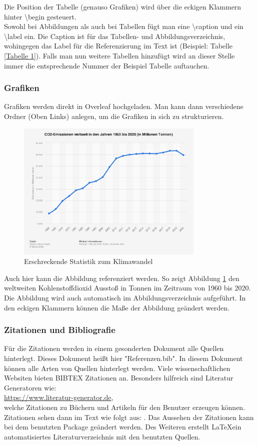 Die Position der Tabelle (genauso Grafiken) wird über die eckigen Klammern hinter \textbackslash begin gesteuert.\\ Sowohl bei Abbildungen als auch bei Tabellen fügt man eine \textbackslash caption und ein \textbackslash label ein. Die Caption ist für das Tabellen- und Abbildungsverzeichnis, wohingegen das Label für die Referenzierung im Text ist (Beispiel: Tabelle \ref{Tabelle 1}). Falls man nun weitere Tabellen hinzufügt wird an dieser Stelle immer die entsprechende Nummer der Beispiel Tabelle auftauchen.
\pagebreak


\subsubsection{Grafiken}
Grafiken werden direkt in Overleaf hochgeladen. Man kann dann verschiedene Ordner (Oben Links) anlegen, um die Grafiken in sich zu strukturieren.

\begin{figure}[H]
 \centering
 \includegraphics[width=0.8\textwidth]{Bilder/Beispiel Bilder/Klimawandel.png}
 \caption{Erschreckende Statistik zum Klimawandel}
 \label{Klimawandel}
\end{figure}
Auch hier kann  die Abbildung referenziert werden. So zeigt Abbildung \ref{Klimawandel} den weltweiten Kohlenstoffdioxid Ausstoß in Tonnen im Zeitraum von 1960 bis 2020. Die Abbildung wird auch automatisch im Abbildungsverzeichnis aufgeführt. In den eckigen Klammern können die Maße der Abbildung geändert werden.
\pagebreak
\subsubsection{Zitationen und Bibliografie}
Für die Zitationen werden in einem gesonderten Dokument alle Quellen hinterlegt. Dieses Dokument heißt hier "Referenzen.bib". In diesem Dokument können alle Arten von Quellen hinterlegt werden. Viele wissenschaftlichen Websiten bieten BIBTEX Zitationen an. Besonders hilfreich sind Literatur Generatoren wie:\\
\url{https://www.literatur-generator.de},\\
welche Zitationen zu Büchern und Artikeln für den Benutzer erzeugen können.\\
Zitationen sehen dann im Text wie folgt aus: \cite{Gates2021}. Das Aussehen der Zitationen kann bei dem benutzten Package geändert werden. Des Weiteren erstellt \LaTeX ein automatisiertes Literaturverzeichnis mit den benutzten Quellen.